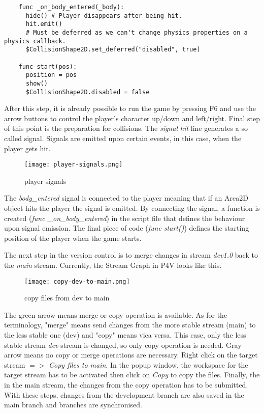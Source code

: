 \begin{enumerate}[resume]
\begin{verbatim}
    func _on_body_entered(_body):
      hide() # Player disappears after being hit.
      hit.emit()
      # Must be deferred as we can't change physics properties on a physics callback.
      $CollisionShape2D.set_deferred("disabled", true)
      
    func start(pos):
      position = pos
      show()
      $CollisionShape2D.disabled = false

  \end{verbatim} 
  After this step, it is already possible to run the game by pressing F6 and use the arrow buttons to control the player's
  character up/down and left/right.
  Final step of this point is the preparation for collisions. The \textit{signal hit} line generates a so called signal.
  Signals are emitted upon certain events, in this case, when the player gets hit.
  \begin{figure}[H]
    \centering
    \texttt{[image: player-signals.png]}
      \caption{player signals}
      \label{fig:player-signals}
  \end{figure}
  The \textit{body\_entered} signal is connected to the player meaning that if an Area2D object hits the player the signal
  is emitted. By connecting the signal, a function is created (\textit{func \_on\_body\_entered}) in the script file that defines the behaviour upon signal
  emission. The final piece of code (\textit{func start()}) defines the starting position of the player when the game starts.
\end{enumerate}
The next step in the version control is to merge changes in stream \textit{dev1.0} back to the \textit{main} stream. Currently,
the Stream Graph in P4V looks like this.
\begin{figure}[H]
  \centering
  \texttt{[image: copy-dev-to-main.png]}
    \caption{copy files from dev to main}
    \label{fig:copy-dev-to-main}
\end{figure}
The green arrow means merge or copy operation is available. As for the terminology, "merge" means send changes from the 
more stable stream (main) to the less stable one (dev) and "copy" means vica versa. This case, only the less stable stream
\textit{dev} stream is changed, so only copy operation is needed. Gray arrow means no copy or merge operations are necessary.
Right click on the target stream {$=>$} \textit{Copy files to main}. In the popup window, the workspace for the target stream
has to be activated then click on \textit{Copy} to copy the files. Finally, the in the main stream, the changes from the 
copy operation has to be submitted. With these steps, changes from the development branch are also saved in the main branch
and branches are synchronised.

